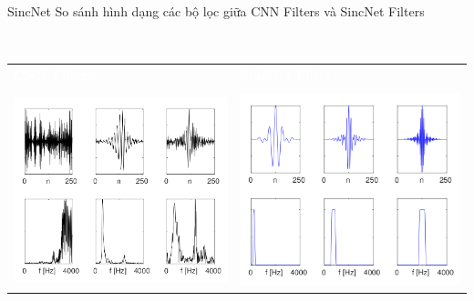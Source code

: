 \documentclass[notheorems, aspectratio=54]{beamer}
\begin{document}
\begin{frame}{SincNet}
	So sánh hình dạng các bộ lọc giữa CNN Filters và SincNet Filters
	\begin{block}{~\vspace{0.7cm}}
		\begin{center}
			\vspace{-0.8cm}
			\begin{tabular}{p{0.45\textwidth}|p{}}
				\textcolor{white}{\bf CNN Filters} & \textcolor{white}{\bf SincNet Filters} \\\\
				\includegraphics[width=1\linewidth]{images/cnn_filters.png} & \includegraphics[width=1\linewidth]{images/sincnet_filters.png}\\
			\end{tabular}
		\end{center}
	\end{block}
\end{frame}
\end{document}
